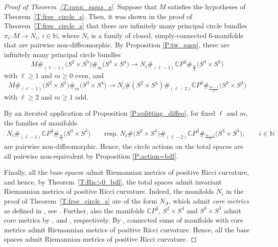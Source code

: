 \documentclass[pdftex]{sigma}
\numberwithin{equation}{section}
\theoremstyle{definition}
\numberwithin{table}{section}
\newcommand{\N}{\mathbb{N}}
\newcommand{\C}{\mathbb{C}}
\begin{document}
\begin{proof}[Proof of Theorem~\ref{T:conn_sums_s}]
	Suppose that $M$ satisfies the hypotheses of Theorem~\ref{T:free_circle_s}. Then, it was shown in the proof of Theorem~\ref{T:free_circle_s} that there are infinitely many principal circle bundles $\pi_i\colon M\to N_i$, $i\in\N$, where $N_i$ is a family of closed, simply-connected $6$-manifolds that are pairwise non-diffeomorphic. By Proposition \ref{P:tw_susp}, there are infinitely many principal circle bundles
	\[ M\#_{(\ell-1)}\bigl(S^2\times S^5\bigr)\#_m\bigl(S^3\times S^4\bigr)\to N_i\#_{(\ell-1)}\C P^3\#_{\frac{m}{2}}\bigl(S^3\times S^3\bigr) \]
	with $\ell\geq 1$ and $m\geq 0$ even, and{\samepage
	\[ M\#_{(\ell-1)}\bigl(S^2\times S^5\bigr)\#_m\bigl(S^3\times S^4\bigr)\to N_i\#(S^2\times S^4)\#_{(\ell-2)}\C P^3\#_{\frac{m-1}{2}}\bigl(S^3\times S^3\bigr) \]
	with $\ell\geq 2$ and $m\geq 1$ odd.}
	
	By an iterated application of Proposition \ref{P:splitting_diffeo}, for fixed $\ell$ and $m$, the families of manifolds
	\begin{gather*}
     N_i\#_{(\ell-1)}\C P^3\#_{\frac{m}{2}}\bigl(S^3\times S^3\bigr)\qquad \text{resp.}\  N_i\#\bigl(S^2\times S^4\bigr)\#_{(\ell-2)}\C P^3\#_{\frac{m-1}{2}}\bigl(S^3\times S^3\bigr),\qquad i\in\N
     \end{gather*}
	are pairwise non-diffeomorphic. Hence, the circle actions on the total spaces are all pairwise non-equivalent by Proposition \ref{P:action=bdl}.
	
	Finally, all the base spaces admit Riemannian metrics of positive Ricci curvature, and hence, by Theorem~\ref{T:Ric>0_bdl}, the total spaces admit invariant Riemannian metrics of positive Ricci curvature. Indeed, the manifolds $N_i$ in the proof of Theorem~\ref{T:free_circle_s} are of the form $N_A$, which admit \emph{core metrics} as defined in \cite{Bu19}, see \cite[Theorem B]{Re23}. Further, also the manifolds $\C P^3$, $S^2\times S^4$ and $S^3\times S^3$ admit core metrics by \cite[Theorem C]{Bu19}, \cite[Theorem C]{Re23} and \cite[Theorem B]{Bu20}, respectively. By \cite[Theorem B]{Bu19}, connected sums of manifolds with core metrics admit Riemannian metrics of positive Ricci curvature. Hence, all the base spaces admit Riemannian metrics of positive Ricci curvature.
\end{proof}
\end{document}
